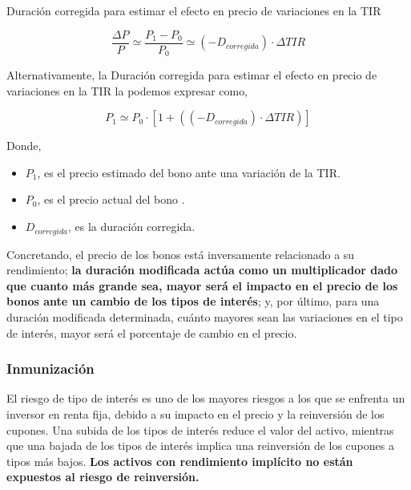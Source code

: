 \documentclass[
  letterpaper,
  DIV=11,
  numbers=noendperiod]{scrreprt}
\begin{document}
\begin{tcolorbox}
\begin{tcolorbox}[enhanced jigsaw, toprule=.15mm, left=2mm, arc=.35mm, breakable, bottomrule=.15mm, opacityback=0, rightrule=.15mm, leftrule=.75mm, colframe=quarto-callout-note-color-frame, colback=white]
\begin{minipage}[t]{5.5mm}
\textcolor{quarto-callout-note-color}{\faInfo}
\end{minipage}%
\begin{minipage}[t]{\textwidth - 5.5mm}

Duración corregida para estimar el efecto en precio de variaciones en la
TIR

\[\frac{\Delta P}{P}\simeq  \frac{P_1-P_0}{P_0}\simeq \left(-D_{corregida}\right)\cdot\Delta TIR\]

Alternativamente, la Duración corregida para estimar el efecto en precio
de variaciones en la TIR la podemos expresar como,

\[P_1\simeq P_0\cdot\left[1+((-D_{corregida})\cdot\Delta TIR)\right]\]

Donde,

\begin{itemize}
\item
  \(P_1\), es el precio estimado del bono ante una variación de la TIR.
\item
  \(P_0\), es el precio actual del bono .
\item
  \(D_{corregida}\), es la duración corregida.
\end{itemize}

\end{minipage}%
\end{tcolorbox}

Concretando, el precio de los bonos está inversamente relacionado a su
rendimiento; \textbf{la duración modificada actúa como un multiplicador
dado que cuanto más grande sea, mayor será el impacto en el precio de
los bonos ante un cambio de los tipos de interés}; y, por último, para
una duración modificada determinada, cuánto mayores sean las variaciones
en el tipo de interés, mayor será el porcentaje de cambio en el precio.

\subsubsection{Inmunización}\label{inmunizaciuxf3n}

El riesgo de tipo de interés es uno de los mayores riesgos a los que se
enfrenta un inversor en renta fija, debido a su impacto en el precio y
la reinversión de los cupones. Una subida de los tipos de interés reduce
el valor del activo, mientras que una bajada de los tipos de interés
implica una reinversión de los cupones a tipos más bajos. \textbf{Los
activos con rendimiento implícito no están expuestos al riesgo de
reinversión.}


\end{tcolorbox}
\end{document}
